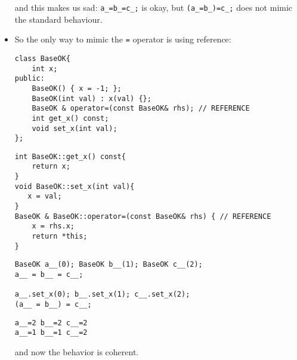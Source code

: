 \begin{itemize}[$\triangleright$]
and this makes us sad: \lstinline|a_=b_=c_;| is okay, but \lstinline|(a_=b_)=c_;| does not mimic the standard behaviour.

\item So the only way to mimic the \texttt{=} operator is using reference:
\begin{lstlisting}
class BaseOK{
    int x;
public:
    BaseOK() { x = -1; };
    BaseOK(int val) : x(val) {};
    BaseOK & operator=(const BaseOK& rhs); // REFERENCE
    int get_x() const;
    void set_x(int val);
};   
\end{lstlisting}
\begin{lstlisting}
int BaseOK::get_x() const{
    return x;
}
void BaseOK::set_x(int val){
   x = val;
}
BaseOK & BaseOK::operator=(const BaseOK& rhs) { // REFERENCE
    x = rhs.x;
    return *this;
}
\end{lstlisting}
\begin{lstlisting}
BaseOK a__(0); BaseOK b__(1); BaseOK c__(2);
a__ = b__ = c__;

a__.set_x(0); b__.set_x(1); c__.set_x(2);
(a__ = b__) = c__;
\end{lstlisting}
\begin{lstlisting}[frame=none]
a__=2 b__=2 c__=2
a__=1 b__=1 c__=2
\end{lstlisting}

and now the behavior is coherent.
\end{itemize}



